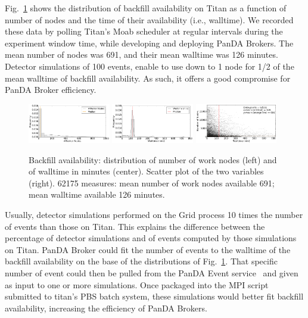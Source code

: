 Fig.~\ref{fig:backfill-distrib} shows the distribution of backfill
availability on Titan as a function of number of nodes and the time of their
availability (i.e., walltime). We recorded these data by polling Titan's Moab
scheduler at regular intervals during the experiment window time, while
developing and deploying PanDA Brokers. The mean number of nodes was 691, and
their mean walltime was 126 minutes. Detector simulations of 100 events, enable
to use down to 1 node for 1/2 of the mean walltime of backfill availability. As
such, it offers a good compromise for PanDA Broker efficiency.

\begin{figure}[!t]
    \includegraphics[clip,width=0.32\textwidth]{figures/titan_backfill_wnodes_distribution.pdf}
    \includegraphics[clip,width=0.32\textwidth]{figures/titan_backfill_walltime_distribution.pdf}
    \includegraphics[clip,width=0.32\textwidth]{figures/titan_backfill_avail.png}
   \vspace{-0.1in}
    \caption{Backfill availability: distribution of number of work nodes (left)
    and of walltime in minutes (center). Scatter plot of the two variables
    (right). 62175 measures: mean number of work nodes available 691; mean
    walltime available 126 minutes.}

\label{fig:backfill-distrib}
\end{figure}

Usually, detector simulations performed on the Grid process 10 times the number
of events than those on Titan. This explains the difference between the
percentage of detector simulations and of events computed by those simulations
on Titan. PanDA Broker could fit the number of events to the walltime of the
backfill availability on the base of the distributions of
Fig.~\ref{fig:backfill-distrib}. That specific number of event could then be
pulled from the PanDA Event service~\cite{calafiura2015atlas} and given as input
to one or more simulations. Once packaged into the MPI script submitted to
titan's PBS batch system, these simulations would better fit backfill
availability, increasing the efficiency of PanDA Brokers.

